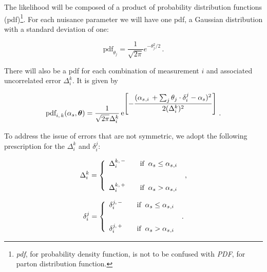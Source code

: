 The likelihood will be composed of a product of probability
distribution functions (pdf)\footnote{
\textit{pdf}, for probability density function, is not to be confused with \textit{PDF}, for parton distribution function.
}.
%
For each nuisance parameter we will have one pdf, a Gaussian
distribution with a standard deviation of one:
% 
\begin{linenomath*}
\begin{equation}
    \text{pdf}_{\theta_j} = 
    \frac{1}{\sqrt{2\pi}} e^{-\theta_j^2/2}
    \,.
\end{equation}
\end{linenomath*}
%
There will also be a pdf for each combination of measurement $i$ and
associated uncorrelated error $\Delta^k_i$. 
%
It is given by
% 
\begin{linenomath*}
\begin{equation}
\text{pdf}_{i,\,k}(\alpha_s, \bm{\theta}) =
    \frac{1}{\sqrt{2\pi} \Delta_i^k}
    \, \mathrm{e}^{ \displaystyle\left[
    -\frac{
        (\alpha_s {}_{,i} \, + \sum_j \theta_j \cdot \delta_i^j - \alpha_s)^2
        }{
        2(\Delta_i^k)^2
        }
    \right] }
    \;.
\end{equation}
\end{linenomath*}
%
To address the issue of errors that are not symmetric, we adopt the
following prescription for the $\Delta_i^k$ and $\delta_i^j$:
% 
\begin{linenomath*}
\begin{equation}
\Delta_i^k =
    \left\{
    \begin{array}{ll}
        \displaystyle
        \Delta_i^{k,\,-}
        & \quad \text{if} \;\; \alpha_s \le \alpha_s {}_{,i}
        \\[20pt]
        \displaystyle
        \Delta_i^{k,\,+}
        & \quad \text{if} \;\; \alpha_s > \alpha_s {}_{,i}
    \end{array}
    \right. 
    \;,
\end{equation}
\end{linenomath*}
% 
\begin{linenomath*}
\begin{equation}
\delta_i^j =
    \left\{
    \begin{array}{ll}
        \displaystyle
        \delta_i^{j,\,-}
        & \quad \text{if} \;\; \alpha_s \le \alpha_s {}_{,i}
        \\[20pt]
        \displaystyle
        \delta_i^{j,\,+}
        & \quad \text{if} \;\; \alpha_s > \alpha_s {}_{,i}
    \end{array}
    \right. 
    \;.
\end{equation}
\end{linenomath*}
